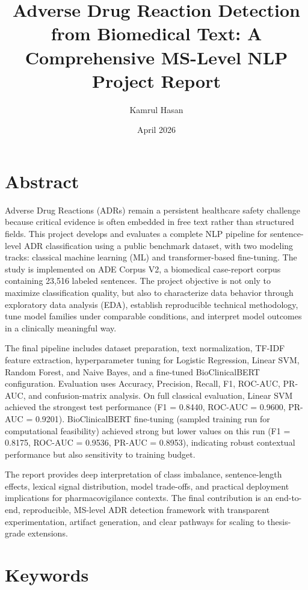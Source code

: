 \documentclass[11pt]{article}
\title{Adverse Drug Reaction Detection from Biomedical Text: A Comprehensive MS-Level NLP Project Report}
\author{Kamrul Hasan}
\date{April 2026}
\begin{document}
\maketitle
\tableofcontents
\newpage

\section{Abstract}

Adverse Drug Reactions (ADRs) remain a persistent healthcare safety challenge because critical evidence is often embedded in free text rather than structured fields. This project develops and evaluates a complete NLP pipeline for sentence-level ADR classification using a public benchmark dataset, with two modeling tracks: classical machine learning (ML) and transformer-based fine-tuning. The study is implemented on ADE Corpus V2, a biomedical case-report corpus containing 23,516 labeled sentences. The project objective is not only to maximize classification quality, but also to characterize data behavior through exploratory data analysis (EDA), establish reproducible technical methodology, tune model families under comparable conditions, and interpret model outcomes in a clinically meaningful way.


The final pipeline includes dataset preparation, text normalization, TF-IDF feature extraction, hyperparameter tuning for Logistic Regression, Linear SVM, Random Forest, and Naive Bayes, and a fine-tuned BioClinicalBERT configuration. Evaluation uses Accuracy, Precision, Recall, F1, ROC-AUC, PR-AUC, and confusion-matrix analysis. On full classical evaluation, Linear SVM achieved the strongest test performance (F1 = 0.8440, ROC-AUC = 0.9600, PR-AUC = 0.9201). BioClinicalBERT fine-tuning (sampled training run for computational feasibility) achieved strong but lower values on this run (F1 = 0.8175, ROC-AUC = 0.9536, PR-AUC = 0.8953), indicating robust contextual performance but also sensitivity to training budget.


The report provides deep interpretation of class imbalance, sentence-length effects, lexical signal distribution, model trade-offs, and practical deployment implications for pharmacovigilance contexts. The final contribution is an end-to-end, reproducible, MS-level ADR detection framework with transparent experimentation, artifact generation, and clear pathways for scaling to thesis-grade extensions.


\section{Keywords}
\end{document}
